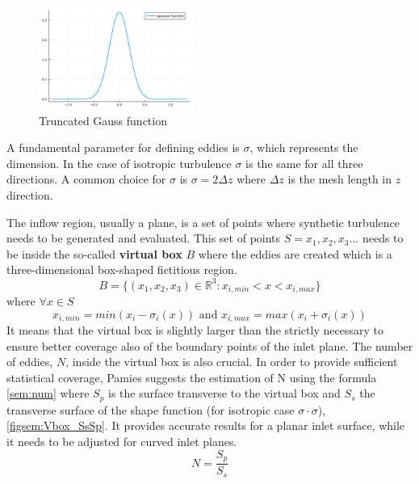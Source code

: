 \documentclass{juliacon}
\begin{document}
\begin{figure}[h]
     \centering
         \includegraphics[width=0.45\textwidth]{Images/shape/trun_gauss_fun.png}
         \caption{Truncated Gauss function}
            \label{figsem:gauss_fun}
\end{figure}




A fundamental parameter for defining eddies is $\sigma$, which represents the dimension. In the case of isotropic turbulence $\sigma$ is the same for all three directions. A common choice for  $\sigma$ is $\sigma = 2\Delta z$ where $\Delta z$ is the mesh length in $z$ direction.

The inflow region, usually a plane, is a set of points where synthetic turbulence needs to be generated and evaluated. This set of points $S = {x_1, x_2, x_3 ...}$ needs to be inside the so-called \textbf{virtual box} $B$ where the eddies are created which is a three-dimensional box-shaped fictitious region.
$$B = \{(x_1,x_2,x_3) \in 	\mathbb{R}^3: x_{i,min}<x<x_{i,max} \}$$
where $\forall x \in S$
$$x_{i,min} = min(x_i-\sigma_i(x)) \text{ and } x_{i,max} = max(x_i+\sigma_i(x)) $$
It means that the virtual box is slightly larger than the strictly necessary to ensure better coverage also of the boundary points of the inlet plane.
The number of eddies, $N$, inside the virtual box is also crucial. In order to provide sufficient statistical coverage, Pamies \cite{Pamies} suggests the estimation of N using the formula \eqref{sem:num} where $S_p$ is the surface transverse to the virtual box and $S_s$ the transverse surface of the shape function (for isotropic case $\sigma\cdot\sigma$), \ref{figsem:Vbox_SsSp}. It provides accurate results for a planar inlet surface, while it needs to be adjusted for curved inlet planes.
\begin{equation}
    N = \dfrac{S_p}{S_s}
    \label{sem:num}
\end{equation}
\end{document}
